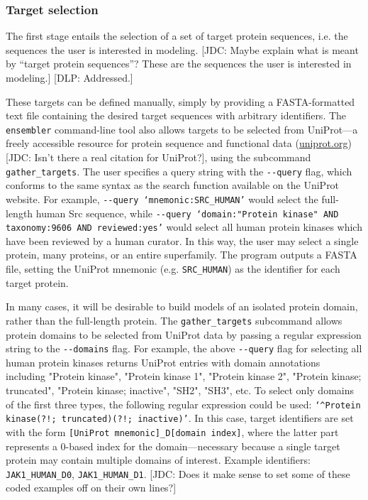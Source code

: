 \documentclass[aps,pre,twocolumn,nofootinbib,superscriptaddress,linenumbers]{revtex4-1}
\begin{document}
\subsubsection*{Target selection}

The first stage entails the selection of a set of target protein sequences, i.e. the sequences the user is interested in modeling.
{\color{red}[JDC: Maybe explain what is meant by ``target protein sequences''?  These are the sequences the user is interested in modeling.]}
{\color{blue}[DLP: Addressed.]}

These targets can be defined manually, simply by providing a FASTA-formatted text file containing the desired target sequences with arbitrary identifiers.
The {\tt ensembler} command-line tool also allows targets to be selected from UniProt---a freely accessible resource for protein sequence and functional data (\href{http://www.uniprot.org/}{uniprot.org}) {\color{red}[JDC: Isn't there a real citation for UniProt?]}, using the subcommand {\tt gather\_targets}.
The user specifies a query string with the {\tt -{}-query} flag, which conforms to the same syntax as the search function available on the UniProt website.
For example, {\tt -{}-query `mnemonic:SRC\_HUMAN'} would select the full-length human Src sequence, while {\tt -{}-query `domain:"Protein kinase" AND taxonomy:9606 AND reviewed:yes'} would select all human protein kinases which have been reviewed by a human curator.
In this way, the user may select a single protein, many proteins, or an entire superfamily.
The program outputs a FASTA file, setting the UniProt mnemonic (e.g. {\tt SRC\_HUMAN}) as the identifier for each target protein.

In many cases, it will be desirable to build models of an isolated protein domain, rather than the full-length protein.
The {\tt gather\_targets} subcommand allows protein domains to be selected from UniProt data by passing a regular expression string to the {\tt -{}-domains} flag. 
For example, the above {\tt -{}-query} flag for selecting all human protein kinases returns UniProt entries with domain annotations including "Protein kinase", "Protein kinase 1", "Protein kinase 2", "Protein kinase; truncated", "Protein kinase; inactive", "SH2", "SH3", etc.
To select only domains of the first three types, the following regular expression could be used: {\tt`\^{}Protein kinase(?!; truncated)(?!; inactive)'}.
In this case, target identifiers are set with the form {\tt [UniProt mnemonic]\_D[domain index]}, where the latter part represents a 0-based index for the domain---necessary because a single target protein may contain multiple domains of interest.
Example identifiers: {\tt JAK1\_HUMAN\_D0}, {\tt JAK1\_HUMAN\_D1}.
{\color{red}[JDC: Does it make sense to set some of these coded examples off on their own lines?]}
\end{document}
